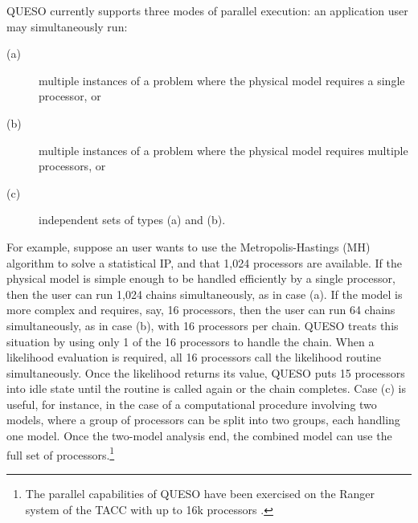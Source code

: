 QUESO currently supports three modes of parallel execution:
an application user may simultaneously run:
\begin{description}
\item[(a)] multiple instances of a problem where the physical model requires a single processor, or
\item[(b)] multiple instances of a problem where the physical model requires multiple processors, or
\item[(c)] independent sets of types (a) and (b).
\end{description}

For example, suppose an user wants to use the Metropolis-Hastings (MH) algorithm to solve a statistical IP, and that 1,024 processors are available.
If the physical model is simple enough to be handled efficiently by a single processor, then the user can run 1,024 chains simultaneously, as in case (a).
If the model is more complex and requires, say, 16 processors, then the user can run 64 chains simultaneously, as in case (b), with 16 processors per chain.
QUESO treats this situation by using only 1 of the 16 processors to handle the chain.
When a likelihood evaluation is required, all 16 processors call the likelihood routine simultaneously.
Once the likelihood returns its value, QUESO puts  15 processors into idle state until the routine is called again or the chain completes.
Case (c) is useful, for instance, in the case of a computational procedure involving two models,
where a group of processors can be split into two groups, each handling one model.
Once the two-model analysis end, the combined model can use the full set of processors.\footnote{The parallel capabilities of QUESO have been exercised on the Ranger system of the TACC \cite{tacc} with up to 16k processors \cite{ChOlPr10}.}


